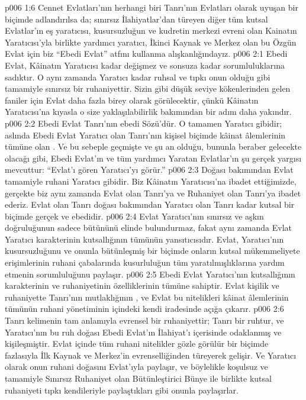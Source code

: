 \vs p006 1:6 Cennet Evlatları’nın herhangi biri Tanrı'nın Evlatları olarak uyuşan bir biçimde adlandırılsa da; sınırsız İlahiyatlar’dan türeyen diğer tüm kutsal Evlatlar’ın eş yaratıcısı, kusursuzluğun ve kudretin merkezi evreni olan Kainatın Yaratıcısı’yla birlikte yardımcı yaratıcı, İkinci Kaynak ve Merkez olan bu Özgün Evlat için biz “Ebedi Evlat” atfını kullanma alışkanlığındayız.
\vs p006 2:1 Ebedi Evlat, Kâinatın Yaratıcısı kadar değişmez ve sonsuza kadar sorumluluklarına sadıktır. O aynı zamanda Yaratıcı kadar ruhsal ve tıpkı onun olduğu gibi tamamiyle sınırsız bir ruhaniyettir. Sizin gibi düşük seviye kökenlerinden gelen faniler için Evlat daha fazla birey olarak görülecektir, çünkü Kâinatın Yaratıcısı’na kıyasla o size yaklaşılabilirlik bakımından bir adım daha yakındır.
\vs p006 2:2 Ebedi Evlat Tanrı’nın ebedi Sözü’dür. O tamamen Yaratıcı gibidir; aslında Ebedi Evlat Yaratıcı olan Tanrı’nın kişisel biçimde kâinat âlemlerinin tümüne olan . Ve bu sebeple geçmişte ve şu an olduğu, bununla beraber gelecekte olacağı gibi, Ebedi Evlat’ın ve tüm yardımcı Yaratan Evlatlar’ın şu gerçek yargısı mevcuttur: “Evlat’ı gören Yaratıcı’yı görür.”
\vs p006 2:3 Doğası bakımından Evlat tamamiyle ruhani Yaratıcı gibidir. Biz Kâinatın Yaratıcısı’na ibadet ettiğimizde, gerçekte biz aynı zamanda Evlat olan Tanrı’ya ve Ruhaniyet olan Tanrı’ya ibadet ederiz. Evlat olan Tanrı doğası bakımından Yaratıcı olan Tanrı kadar kutsal bir biçimde gerçek ve ebedidir.
\vs p006 2:4 Evlat Yaratıcı’nın sınırsız ve aşkın doğruluğunun sadece bütününü elinde bulundurmaz, fakat aynı zamanda Evlat Yaratıcı karakterinin kutsallığının tümünün yansıtıcısıdır. Evlat, Yaratıcı’nın kusursuzluğunu ve onunla bütünleşmiş bir biçimde onların kutsal mükemmeliyete erişimlerinin ruhani çabalarında kusurluluğun tüm yaratılmışlıklarına yardım etmenin sorumluluğunu paylaşır.
\vs p006 2:5 Ebedi Evlat Yaratıcı’nın kutsallığının karakterinin ve ruhaniyetinin özelliklerinin tümüne sahiptir. Evlat kişilik ve ruhaniyette Tanrı’nın mutlaklığının , ve Evlat bu nitelikleri kâinat âlemlerinin tümünün ruhani yönetiminin içindeki kendi iradesinde açığa çıkarır.
\vs p006 2:6 Tanrı kelimenin tam anlamıyla evrensel bir ruhaniyettir; Tanrı bir ruhtur, ve Yaratıcı’nın bu ruh doğası Ebedi Evlat’ın İlahiyat’ı içerisinde odaklanmış ve kişileşmiştir. Evlat içinde tüm ruhani nitelikler gözle görülür bir biçimde fazlasıyla İlk Kaynak ve Merkez’in evrenselliğinden türeyerek gelişir. Ve Yaratıcı olarak onun ruhani doğasını Evlat’ıyla paylaşır, ve böylelikle koşulsuz ve tamamiyle Sınırsız Ruhaniyet olan Bütünleştirici Bünye ile birlikte kutsal ruhaniyeti tıpkı kendileriyle paylaştıkları gibi onunla paylaşırlar.
